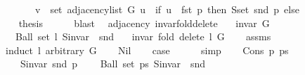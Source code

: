 \begin{isabellebody}
\ \ \ \ \ \ \ v\ {\isasymin}\ set\ {\isacharparenleft}{\kern0pt}adjacency{\isacharunderscore}{\kern0pt}list\ G\ u{\isacharparenright}{\kern0pt}\ {\isacharminus}{\kern0pt}\ {\isacharparenleft}{\kern0pt}if\ u\ {\isacharequal}{\kern0pt}\ fst\ p\ then\ S{\isachardot}{\kern0pt}set\ {\isacharparenleft}{\kern0pt}snd\ p{\isacharparenright}{\kern0pt}\ else\ {\isacharbraceleft}{\kern0pt}{\isacharbraceright}{\kern0pt}{\isacharparenright}{\kern0pt}{\isachardoublequoteclose}\isanewline
\ \ \ \ \ \ \isacommand{{\isachardot}{\kern0pt}}\isamarkupfalse%
\ \isacommand{{\isacharbraceright}{\kern0pt}}\isamarkupfalse%
\isanewline
\ \ \isamarkupfalse%
\ {\isacharquery}{\kern0pt}thesis\isanewline
\ \ \ \ \isamarkupfalse%
\ blast\isanewline
{}\isamarkupfalse%
%
\endisatagproof
{\isafoldproof}%
%
\isadelimproof
\isanewline
%
\endisadelimproof
\isanewline
{}\isamarkupfalse%
\ {\isacharparenleft}{\kern0pt}\ adjacency{\isacharparenright}{\kern0pt}\ invar{\isacharunderscore}{\kern0pt}fold{\isacharunderscore}{\kern0pt}delete{\isacharunderscore}{\kern0pt}{}{\isacharcolon}{\kern0pt}\isanewline
\ \ \ {\isachardoublequoteopen}invar\ G{\isachardoublequoteclose}\isanewline
\ \ \ {\isachardoublequoteopen}Ball\ {\isacharparenleft}{\kern0pt}set\ l{\isacharparenright}{\kern0pt}\ {\isacharparenleft}{\kern0pt}S{\isachardot}{\kern0pt}invar\ {\isasymcirc}\ snd{\isacharparenright}{\kern0pt}{\isachardoublequoteclose}\isanewline
\ \ \ {\isachardoublequoteopen}invar\ {\isacharparenleft}{\kern0pt}fold\ delete{\isacharunderscore}{\kern0pt}{}\ l\ G{\isacharparenright}{\kern0pt}{\isachardoublequoteclose}\isanewline
%
\isadelimproof
\ \ %
\endisadelimproof
%
\isatagproof
{}\isamarkupfalse%
\ assms\isanewline
{}\isamarkupfalse%
\ {\isacharparenleft}{\kern0pt}induct\ l\ arbitrary{\isacharcolon}{\kern0pt}\ G{\isacharparenright}{\kern0pt}\isanewline
\ \ \isamarkupfalse%
\ Nil\isanewline
\ \ \isamarkupfalse%
\ {\isacharquery}{\kern0pt}case\isanewline
\ \ \ \ \isamarkupfalse%
\ simp\isanewline
{}\isamarkupfalse%
\isanewline
\ \ \isamarkupfalse%
\ {\isacharparenleft}{\kern0pt}Cons\ p\ ps{\isacharparenright}{\kern0pt}\isanewline
\ \ \isamarkupfalse%
\isanewline
\ \ \ \ {\isachardoublequoteopen}S{\isachardot}{\kern0pt}invar\ {\isacharparenleft}{\kern0pt}snd\ p{\isacharparenright}{\kern0pt}{\isachardoublequoteclose}\isanewline
\ \ \ \ {\isachardoublequoteopen}Ball\ {\isacharparenleft}{\kern0pt}set\ ps{\isacharparenright}{\kern0pt}\ {\isacharparenleft}{\kern0pt}S{\isachardot}{\kern0pt}invar\ {\isasymcirc}\ snd{\isacharparenright}{\kern0pt}{\isachardoublequoteclose}\isanewline

\end{isabellebody}
